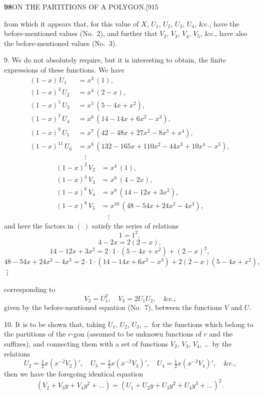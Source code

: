 \documentclass[11pt]{article}
\begin{document}
\newpage
\noindent\textbf{98}\hfill ON THE PARTITIONS OF A POLYGON.\hfill[915

\smallskip
from which it appears that, for this value of $X$, $U_{1}$, $U_{2}$, $U_{3}$,
$U_{4}$, \&c., have the before-mentioned values (No.~2), and further that
$V_{2}$, $V_{3}$, $V_{4}$, $V_{5}$, \&c., have also the before-mentioned
values (No.~3).

\hspace{1em} 9. We do not absolutely require, but it is interesting to obtain,
the finite expressions of these functions. We have
\[
\begin{aligned}
(1-x)\,U_{1} &= x^{3}\,(1),\\
(1-x)^{3}\,U_{2} &= x^{4}\,(2-x),\\
(1-x)^{5}\,U_{3} &= x^{5}\,(5-4x+x^{2}),\\
(1-x)^{7}\,U_{4} &= x^{6}\,(14-14x+6x^{2}-x^{3}),\\
(1-x)^{9}\,U_{5} &= x^{7}\,(42-48x+27x^{2}-8x^{3}+x^{4}),\\
(1-x)^{11}\,U_{6} &= x^{8}\,(132-165x+110x^{2}-44x^{3}+10x^{4}-x^{5}),\\
&\quad\vdots
\end{aligned}
\]
\[
\begin{aligned}
(1-x)^{2}\,V_{2} &= x^{4}\,(1),\\
(1-x)^{4}\,V_{3} &= x^{6}\,(4-2x),\\
(1-x)^{6}\,V_{4} &= x^{8}\,(14-12x+3x^{2}),\\
(1-x)^{8}\,V_{5} &= x^{10}\,(48-54x+24x^{2}-4x^{3}),\\
&\quad\vdots
\end{aligned}
\]
and here the factors in $(\ )$ satisfy the series of relations
\[
1=1^{2},
\]
\[
4-2x=2(2-x),
\]
\[
14-12x+3x^{2}=2\cdot 1\cdot(5-4x+x^{2})+(2-x)^{2},
\]
\[
48-54x+24x^{2}-4x^{3}=2\cdot 1\cdot(14-14x+6x^{2}-x^{3})+2(2-x)(5-4x+x^{2}),
\]
\hspace*{4em}\vdots

\noindent corresponding to
\[
V_{2}=U_{1}^{2},\quad V_{3}=2U_{1}U_{2},\quad \&\text{c.,}
\]
given by the before-mentioned equation (No.~7), between the functions $V$ and
$U$.

\hspace{1em} 10. It is to be shown that, taking $U_{1}$, $U_{2}$, $U_{3}$,
\ldots\ for the functions which belong to the partitions of the $r$-gon
(assumed to be unknown functions of $r$ and the suffixes), and connecting
them with a set of functions $V_{2}$, $V_{3}$, $V_{4}$, \ldots\ by the
relations
\[
U_{2}=\tfrac{1}{2}x(x^{-2}V_{2})',\quad U_{3}=\tfrac{1}{2}x(x^{-2}V_{3})',\quad U_{4}=\tfrac{1}{2}x(x^{-2}V_{4})',\quad\&\text{c.,}
\]
then we have the foregoing identical equation
\[
(V_{2}+V_{3}y+V_{4}y^{2}+\ldots)=(U_{1}+U_{2}y+U_{3}y^{2}+U_{4}y^{3}+\ldots)^{2}.
\]
\end{document}
